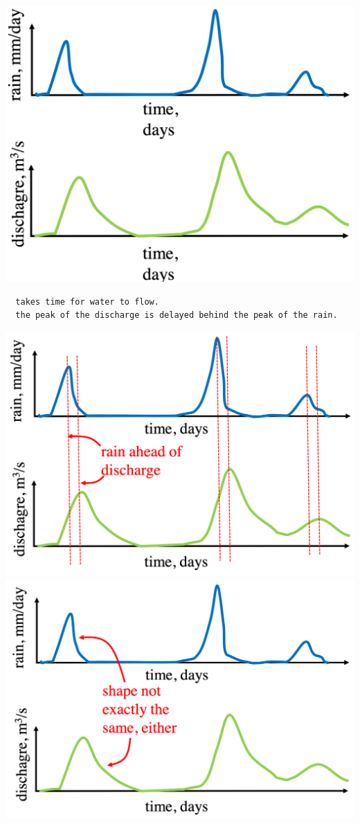 \documentclass[11pt]{article}
\theoremstyle{definition}
\begin{document}
\includegraphics[width=\textwidth/2]{10.png}

\begin{verbatim}
  takes time for water to flow. 
  the peak of the discharge is delayed behind the peak of the rain.
\end{verbatim}

\includegraphics[width=\textwidth/4]{11.png}
\includegraphics[width=\textwidth/4]{12.png}
\end{document}
